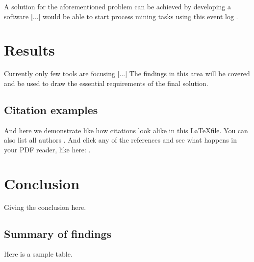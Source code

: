 A solution for the aforementioned problem can be achieved by developing a software  [...] would be able to start process mining tasks using this event log \parencite{hoehle_espoused_2015, venkatesh_usability_2014}.

\newpage\section{Results}

Currently only few tools are focusing [...]  The findings in this area will be covered and be used to draw the essential requirements of the final solution. 

\subsection{Citation examples}

And here we demonstrate like \parencite{hoehle_espoused_2015} how citations look alike in this \LaTeX file. You can also list all authors \parencite{venkatesh_usability_2014}. And click any of the references and see what happens in your PDF reader, like here: \textcite{university_of_arkansas_mobile_2015}.

\newpage
\section{Conclusion}

Giving the conclusion here.

 \subsection{Summary of findings}

Here is a sample table. 

